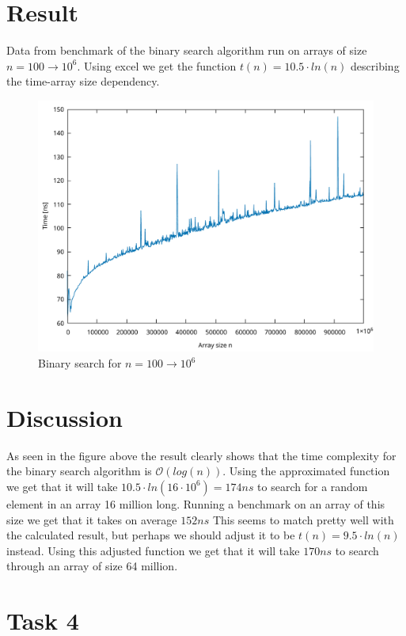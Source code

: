 \documentclass[a4paper,11pt]{article}
\begin{document}
\section*{Result}
Data from benchmark of the binary search algorithm run on arrays of size $n = 100 \to 10^6$.
Using excel we get the function $t(n)=10.5\cdot ln(n)$ describing the time-array size dependency.
\begin{figure}[h!]
  \centering
  \includegraphics[width=\textwidth]{binaryLinearSearch.pdf}
  \caption{Binary search for $n =100\to 10^6$}
\end{figure}

\FloatBarrier
\section*{Discussion}
As seen in the figure above the result clearly shows that the time complexity for the binary
search algorithm is $\mathcal{O}(log(n))$. Using the approximated function we get that it
will take $10.5 \cdot ln(16\cdot 10^6)=174ns$ to search for a random element in an array
16 million long. Running a benchmark on an array of this size we get that it takes on average
$152ns$ This seems to match pretty well with the calculated result, but perhaps we should
adjust it to be $t(n)=9.5\cdot ln(n)$ instead. Using this adjusted function we get that it
will take $170ns$ to search through an array of size 64 million.

\section*{Task 4}
\end{document}
